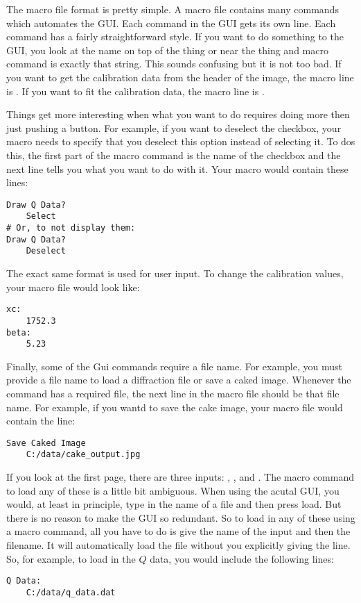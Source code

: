 The macro file format is pretty simple. A macro file contains many commands which automates the GUI. Each command in the GUI gets its own line. Each command has a fairly straightforward style. If you want to do something to the GUI, you look at the name on top of the thing or near the thing and macro command is exactly that string. This sounds confusing but it is not too bad. If you want to get the calibration data from the header of the image, the macro line is . If you want to fit the calibration data, the macro line is .

Things get more interesting when what you want to do requires doing more then just pushing a button. For example, if you want to deselect the  checkbox, your macro needs to specify that you deselect this option instead of selecting it. To dos this, the first part of the macro command is the name of the checkbox  and the next line tells you what you want to do with it. Your macro would contain these lines:
\begin{lstlisting}[caption={'Draw the $Q$ Lines on the Display'}]
Draw Q Data?
    Select
# Or, to not display them:
Draw Q Data?
    Deselect
\end{lstlisting}
The exact same format is used for user input. To change the calibration values, your macro file would look like:
\begin{lstlisting}[caption={'Input a Number'}]
xc:
    1752.3
beta:
    5.23
\end{lstlisting}
Finally, some of the Gui commands require a file name. For example, you must provide a file name to load a diffraction file or save a caked image. Whenever the command has a required file, the next line in the macro file should be that file name. For example, if you wantd to save the cake image, your macro file would contain the line: 
\begin{lstlisting}[caption={'Save the Caked Image'}]
Save Caked Image
    C:/data/cake_output.jpg
\end{lstlisting}

If you look at the first page, there are three inputs: , , and . The macro command to load any of these is a little bit ambiguous. When using the acutal GUI, you would, at least in principle, type in the name of a file and then press load. But there is no reason to make the GUI so redundant. So to load in any of these using a macro command, all you have to do is give the name of the input and then the filename. It will automatically load the file without you explicitly giving the  line. So, for example, to load in the $Q$ data, you would include the following lines:
\begin{lstlisting}[caption={'Load the $Q$ Data'}]
Q Data:
    C:/data/q_data.dat
\end{lstlisting}


